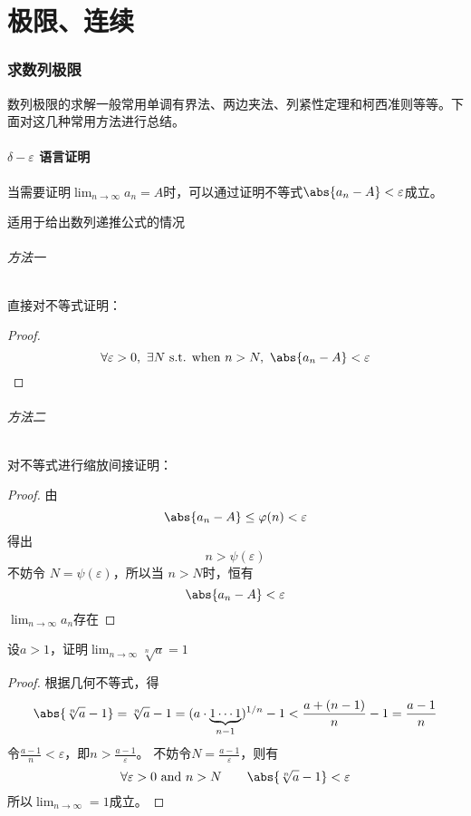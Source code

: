 \part{极限、连续}

\section{求数列极限}
数列极限的求解一般常用单调有界法、两边夹法、列紧性定理和柯西准则等等。下面对这几种常用方法进行总结。
\subsection{\texorpdfstring{$ \delta - \varepsilon  $}{δ-ε} 语言证明}
当需要证明$\lim_{n \to \infty} a_n = A$时，可以通过证明不等式$ \abs{a_n - A} < \varepsilon $成立。
\begin{situation}
    适用于给出数列递推公式的情况
\end{situation}
\paragraph{方法一} 直接对不等式证明：
\begin{proof}
    \[
        \forall \varepsilon > 0, ~ \exists N ~ \text{s.t. when}~ n > N,~
        \abs{a_n - A} < \varepsilon
    \]
\end{proof}


\paragraph{方法二} 对不等式进行缩放间接证明：
\begin{proof}
    由\[ \abs{a_n - A} \leq \varphi(n) < \varepsilon \]
    得出 \[ n > \psi(\varepsilon) \]
    不妨令 $N = \psi(\varepsilon)$，所以当 $n > N$时，恒有
    \[ \abs{a_n - A} < \varepsilon \]
    $\lim_{n \to \infty} a_n$存在
\end{proof}

\begin{example}
    设$ a > 1 $，证明$ \lim_{n \to \infty} \sqrt[n]{a} = 1 $
\end{example}
\begin{proof}
    根据几何不等式，得
    \[
        \abs{\sqrt[n]{a} - 1}
        = \sqrt[n]{a} - 1
        = (a \cdot \underbrace{1\cdots1}_{n-1})^{1/n} - 1
        < \frac{a+(n-1)}{n} - 1
        = \frac{a-1}{n}
    \]
    令$ \frac{a-1}{n}<\varepsilon $，即$ n > \frac{a-1}{\varepsilon} $。
    不妨令$N = \frac{a-1}{\varepsilon}$，则有
    \[
        \forall\varepsilon>0 \text{ and } n > N \qquad \abs{\sqrt[n]{a}-1} <\varepsilon
    \]
    所以$\lim_{n \to \infty} = 1$成立。
\end{proof}

